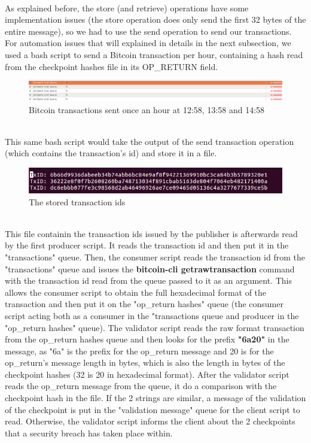 \\
As explained before, the store (and retrieve) operations have some implementation issues (the store operation does only send the first 32 bytes of the entire message), so we had to use the send operation to send our transactions. For automation issues that will explained in details in the next subsection, we used a bash script to send a Bitcoin transaction per hour, containing a hash read from the checkpoint hashes file in its OP\_RETURN field.\\
\begin{figure}[htp]
    \centering
    \includegraphics[scale=0.42]{out1}
    \caption{Bitcoin transactions sent once an hour at 12:58, 13:58 and 14:58}
\end{figure}
\\
This same bash script would take the output of the send transaction operation (which contains the transaction's id) and store it in a file.
\begin{figure}[htp]
    \centering
    \includegraphics[scale=0.42]{txs}
    \caption{The stored transaction ids}
\end{figure}
\\
This file containin the transaction ids issued by the publisher is afterwards read by the first producer script. It reads the transaction id and then put it in the "transactions" queue. Then, the consumer script reads the transaction id from the "transactions" queue and issues the \textbf{bitcoin-cli getrawtransaction} command with the transaction id read from the queue passed to it as an argument. This allows the consumer script to obtain the full hexadecimal format of the transaction and then put it on the "op\_return hashes" queue (the consumer script acting both as a consumer in the "transactions queue and producer in the "op\_return hashes" queue). The validator script reads the raw format transaction from the op\_return hashes queue and then looks for the prefix \textbf{"6a20"} in the message, as "6a" is the prefix for the op\_return message and 20 is for the op\_return's message length in bytes, which is also the length in bytes of the checkpoint hashes (32 is 20 in hexadecimal format). After the validator script reads the op\_return message from the queue, it do a comparison with the checkpoint hash in the file. If the 2 strings are similar, a message of the validation of the checkpoint is put in the "validation message" queue for the client script to read. Otherwise, the validator script informs the client about the 2 checkpoints that a security breach has taken place within.  
